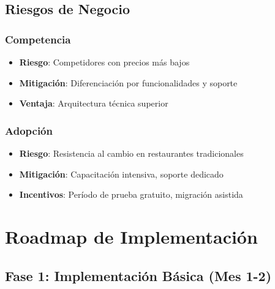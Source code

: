 \documentclass[12pt,a4paper]{article}
\begin{document}
\subsection{Riesgos de Negocio}

\subsubsection{Competencia}

\begin{itemize}
    \item \textbf{Riesgo}: Competidores con precios más bajos
    \item \textbf{Mitigación}: Diferenciación por funcionalidades y soporte
    \item \textbf{Ventaja}: Arquitectura técnica superior
\end{itemize}

\subsubsection{Adopción}

\begin{itemize}
    \item \textbf{Riesgo}: Resistencia al cambio en restaurantes tradicionales
    \item \textbf{Mitigación}: Capacitación intensiva, soporte dedicado
    \item \textbf{Incentivos}: Período de prueba gratuito, migración asistida
\end{itemize}

\section{Roadmap de Implementación}

\subsection{Fase 1: Implementación Básica (Mes 1-2)}
\end{document}
